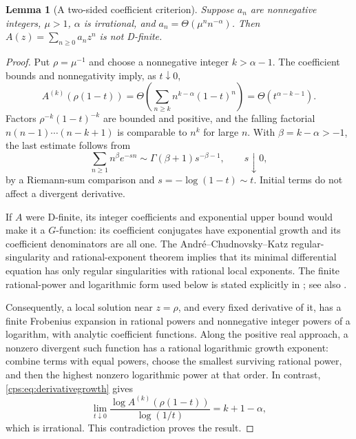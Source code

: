 \documentclass[11pt,letterpaper]{article}
\numberwithin{equation}{section}
\newtheorem{lemma}[theorem]{Lemma}
\theoremstyle{remark}\newtheorem{remark}[theorem]{Remark}
\begin{document}
\begin{lemma}[A two-sided coefficient criterion]\label{cps:lem:nonD}
Suppose $a_n$ are nonnegative integers, $\mu>1$, $\alpha$ is irrational, and $a_n=\Theta(\mu^n n^{-\alpha})$. Then $A(z)=\sum_{n\ge0}a_nz^n$ is not D-finite.
\end{lemma}
\begin{proof}
Put $\rho=\mu^{-1}$ and choose a nonnegative integer $k>\alpha-1$. The coefficient bounds and nonnegativity imply, as $t\downarrow0$,
\begin{equation}\label{cps:eq:derivativegrowth}
 A^{(k)}(\rho(1-t))
 =\Theta\!\left(\sum_{n\ge k}n^{k-\alpha}(1-t)^n\right)
 =\Theta(t^{\alpha-k-1}).
\end{equation}
Factors $\rho^{-k}(1-t)^{-k}$ are bounded and positive, and the falling factorial $n(n-1)\cdots(n-k+1)$ is comparable to $n^k$ for large $n$. With $\beta=k-\alpha>-1$, the last estimate follows from
\begin{equation}
 \sum_{n\ge1}n^\beta e^{-sn}\sim\Gamma(\beta+1)s^{-\beta-1},\qquad s\downarrow0,
\end{equation}
by a Riemann-sum comparison and $s=-\log(1-t)\sim t$. Initial terms do not affect a divergent derivative.

If $A$ were D-finite, its integer coefficients and exponential upper bound would make it a $G$-function: its coefficient conjugates have exponential growth and its coefficient denominators are all one. The Andr\'e--Chudnovsky--Katz regular-singularity and rational-exponent theorem implies that its minimal differential equation has only regular singularities with rational local exponents. The finite rational-power and logarithmic form used below is stated explicitly in \cite[Theorem 6, Section 4.1]{FR}; see also \cite[Section 2.2, proof of Theorem 2]{BRS}.

Consequently, a local solution near $z=\rho$, and every fixed derivative of it, has a finite Frobenius expansion in rational powers and nonnegative integer powers of a logarithm, with analytic coefficient functions. Along the positive real approach, a nonzero divergent such function has a rational logarithmic growth exponent: combine terms with equal powers, choose the smallest surviving rational power, and then the highest nonzero logarithmic power at that order. In contrast, \eqref{cps:eq:derivativegrowth} gives
\begin{equation}
 \lim_{t\downarrow0}\frac{\log A^{(k)}(\rho(1-t))}{\log(1/t)}=k+1-\alpha,
\end{equation}
which is irrational. This contradiction proves the result.
\end{proof}
\end{document}

